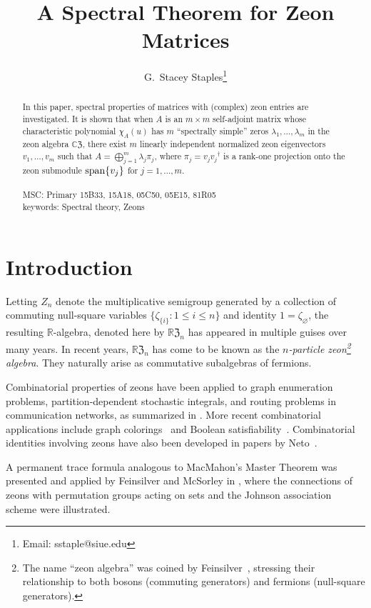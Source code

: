 \documentclass{article}
\title{A Spectral Theorem for Zeon Matrices}
\author{G.~Stacey Staples\footnote{Email: sstaple@siue.edu}}
\affil{Department of Mathematics \&
Statistics\\
Southern Illinois University Edwardsville\\
Edwardsville, IL 62026-1653\\
USA}
\date{}
\theoremstyle{definition}
\newcommand{\RZ}{\mathbb{R}\mathfrak{Z}}
\numberwithin{equation}{section}
\begin{document}
\maketitle

\begin{abstract}
In this paper, spectral properties of matrices with (complex) zeon entries are investigated.  
It is shown that when $A$ is an $m\times m$ self-adjoint matrix whose characteristic polynomial $\chi_A(u)$ has $m$ ``spectrally simple'' zeros $\lambda_1, \ldots, \lambda_m$ in the zeon algebra ${\mathbb{C}\mathfrak{Z}}$, there exist $m$  linearly independent normalized zeon eigenvectors $v_1, \ldots, v_m$ such that $A=\bigoplus_{j=1}^m \lambda_j\pi_j$, where $\pi_j=v_j{v_j}^\dag$ is a rank-one projection onto the zeon submodule ${\rm span}\{v_j\}$ for $j=1, \ldots, m$.   
\\
\\
MSC: Primary 15B33, 15A18, 05C50, 05E15, 81R05
\\
keywords: Spectral theory, Zeons
\end{abstract}


\section{Introduction}

Letting $Z_n$ denote the multiplicative semigroup generated by a collection of commuting null-square variables $\{\zeta_{\{i\}}:1\le i\le n\}$ and identity $1=\zeta_\varnothing$, the resulting $\mathbb{R}$-algebra,  denoted here by $\RZ_n$ has appeared in multiple guises over many years.  In recent years, $\RZ_n$ has come to be known as the {\em $n$-particle zeon\footnote{The name ``zeon algebra'' was coined by Feinsilver~\cite{Feinsilverzeons}, stressing their relationship to both bosons (commuting generators) and fermions (null-square generators).} algebra}.   They naturally arise as commutative subalgebras of fermions.

Combinatorial properties of zeons have been applied to graph enumeration problems, partition-dependent stochastic integrals, and routing problems in communication networks, as summarized in \cite{OCGraphs}.   More recent combinatorial applications include graph colorings~\cite{StaplesStellhorn2017} and Boolean satisfiability~\cite{DavisStaples2019}.   Combinatorial identities involving zeons have also been developed in papers by Neto~\cite{NetoJIS2014,NetoJIS2015,NetoJIS2016,NetoSIAM}.   
   
A permanent trace formula analogous to MacMahon's Master Theorem was presented and applied by Feinsilver and McSorley in \cite{FeinsilverMcSorleyIJC}, where the connections of zeons with permutation groups acting on sets and the Johnson association scheme were illustrated.  
\end{document}
